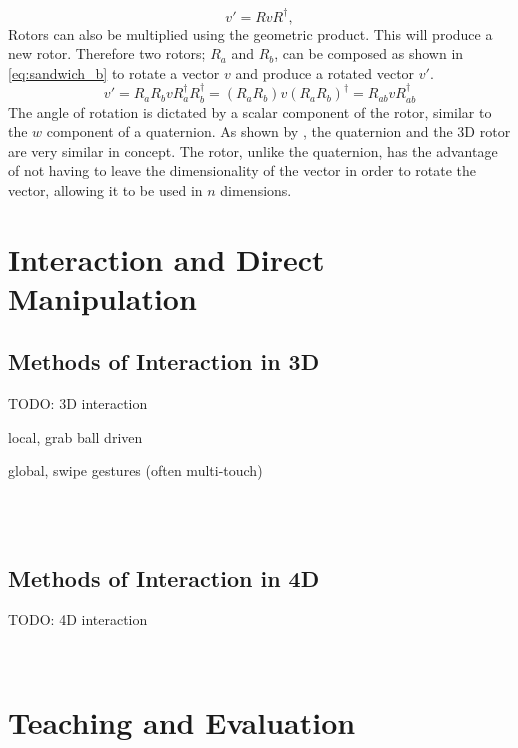 \documentclass{l4proj}
\begin{document}
%
\begin{equation}
  \label{eq:sandwich_a}
    v' = R v R^\dagger,
\end{equation}
%
Rotors can also be multiplied using the geometric product. This will produce a new rotor. Therefore two rotors; $R_a$ and $R_b$, can be composed as shown in \cref{eq:sandwich_b} to rotate a vector \(v\) and produce a rotated vector \(v'\).
%
\begin{equation}
  \label{eq:sandwich_b}
  v' = R_a R_b v R_a^{\dagger} R_b^{\dagger}
   = (R_a R_b) v (R_a R_b)^{\dagger}
   = R_{ab}^{} v R_{ab}^{\dagger}
\end{equation}
%
The angle of rotation is dictated by a scalar component of the rotor, similar to the \(w\) component of a quaternion. 
As shown by \citep{bosch_code_nodate}, the quaternion and the 3D rotor are very similar in concept. The rotor, unlike the quaternion, has the advantage of not having to leave the dimensionality of the vector in order to rotate the vector, allowing it to be used in \(n\) dimensions.

\section{Interaction and Direct Manipulation}

\subsection{Methods of Interaction in 3D}

TODO: 3D interaction

local, grab ball driven

global, swipe gestures (often multi-touch)

\citep{shoemake_arcball_1994}\\
\citep{hinckley_usability_1997}\\
\citep{balakrishnan_rockinmouse_1997}

\subsection{Methods of Interaction in 4D}

TODO: 4D interaction

\citep{murata_interactive_2000}\\
\citep{kageyama_keyboard-based_2005}

\section{Teaching and Evaluation}
\label{teaching_and_eval}
\end{document}
